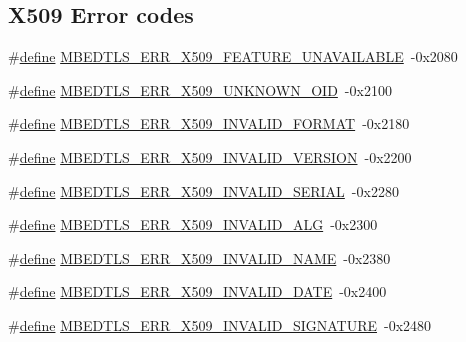 \subsection*{X509 Error codes}
\begin{DoxyCompactItemize}
\item 
\#\hyperlink{structdefine}{define} \hyperlink{group__x509__module_ga185bc7f27a2b1f7742537a2377c52ee3}{M\+B\+E\+D\+T\+L\+S\+\_\+\+E\+R\+R\+\_\+\+X509\+\_\+\+F\+E\+A\+T\+U\+R\+E\+\_\+\+U\+N\+A\+V\+A\+I\+L\+A\+B\+LE}~-\/0x2080
\item 
\#\hyperlink{structdefine}{define} \hyperlink{group__x509__module_gab4e8e2e41bfe62e969343efaa2784103}{M\+B\+E\+D\+T\+L\+S\+\_\+\+E\+R\+R\+\_\+\+X509\+\_\+\+U\+N\+K\+N\+O\+W\+N\+\_\+\+O\+ID}~-\/0x2100
\item 
\#\hyperlink{structdefine}{define} \hyperlink{group__x509__module_ga45b8366804b7e2cbf3e25011f054802c}{M\+B\+E\+D\+T\+L\+S\+\_\+\+E\+R\+R\+\_\+\+X509\+\_\+\+I\+N\+V\+A\+L\+I\+D\+\_\+\+F\+O\+R\+M\+AT}~-\/0x2180
\item 
\#\hyperlink{structdefine}{define} \hyperlink{group__x509__module_ga527608dc04b2c831fe5b161ec26aab76}{M\+B\+E\+D\+T\+L\+S\+\_\+\+E\+R\+R\+\_\+\+X509\+\_\+\+I\+N\+V\+A\+L\+I\+D\+\_\+\+V\+E\+R\+S\+I\+ON}~-\/0x2200
\item 
\#\hyperlink{structdefine}{define} \hyperlink{group__x509__module_ga8124a68edabf35ed9323880584128f16}{M\+B\+E\+D\+T\+L\+S\+\_\+\+E\+R\+R\+\_\+\+X509\+\_\+\+I\+N\+V\+A\+L\+I\+D\+\_\+\+S\+E\+R\+I\+AL}~-\/0x2280
\item 
\#\hyperlink{structdefine}{define} \hyperlink{group__x509__module_gae16cddbd42e08f6dd093cf4326e59413}{M\+B\+E\+D\+T\+L\+S\+\_\+\+E\+R\+R\+\_\+\+X509\+\_\+\+I\+N\+V\+A\+L\+I\+D\+\_\+\+A\+LG}~-\/0x2300
\item 
\#\hyperlink{structdefine}{define} \hyperlink{group__x509__module_ga8f61c2f303bf065af4f783e03f952ede}{M\+B\+E\+D\+T\+L\+S\+\_\+\+E\+R\+R\+\_\+\+X509\+\_\+\+I\+N\+V\+A\+L\+I\+D\+\_\+\+N\+A\+ME}~-\/0x2380
\item 
\#\hyperlink{structdefine}{define} \hyperlink{group__x509__module_gac36bf085ce8f7f57f039bda8828bd824}{M\+B\+E\+D\+T\+L\+S\+\_\+\+E\+R\+R\+\_\+\+X509\+\_\+\+I\+N\+V\+A\+L\+I\+D\+\_\+\+D\+A\+TE}~-\/0x2400
\item 
\#\hyperlink{structdefine}{define} \hyperlink{group__x509__module_ga022c175386f082b4e056e6268ee68cab}{M\+B\+E\+D\+T\+L\+S\+\_\+\+E\+R\+R\+\_\+\+X509\+\_\+\+I\+N\+V\+A\+L\+I\+D\+\_\+\+S\+I\+G\+N\+A\+T\+U\+RE}~-\/0x2480
\item 

\end{DoxyCompactItemize}
